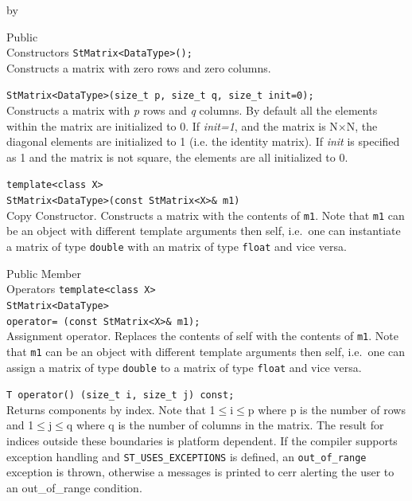 \documentclass[twoside]{article}
\newcommand{\comp}[1]{\texttt{#1}}%
\newcommand{\entrylabel}[1]{\mbox{\textbf{{#1}}}\hfil}%
\newenvironment{entry}
{\begin{list}{}%
    {\renewcommand{\makelabel}{\entrylabel}%
     \setlength{\labelwidth}{90pt}%
     \setlength{\leftmargin}{\labelwidth}
     \advance\leftmargin by \labelsep%
      }%
    }%
  {\end{list}}
\newcommand{\Entrylabel}[1]%
{\raisebox{0pt}[1ex][0pt]{\makebox[\labelwidth][l]%
    {\parbox[t]{\labelwidth}{\hspace{0pt}\textbf{{#1}}}}}}
\newenvironment{Entry}%
{\renewcommand{\entrylabel}{\Entrylabel}\begin{entry}}%
  {\end{entry}}
\begin{document}
\begin{description}
\begin{Entry}
\item[Public\\ Constructors]
    \verb+StMatrix<DataType>();+ \\
    Constructs a matrix with zero rows and zero columns.
    
    \verb+StMatrix<DataType>(size_t p, size_t q, size_t init=0);+ \\
    Constructs a matrix with {\em p} rows and {\em q} columns.  By
    default all the elements within the matrix are initialized
    to 0.  If {\em init=1}, and the matrix is N$\times$N, the diagonal
    elements are initialized to 1 (i.e. the identity matrix).  If
    {\em init} is specified as 1 and the matrix is not square, the
    elements are all initialized to 0.

    \verb+template<class X>+\\
    \verb+StMatrix<DataType>(const StMatrix<X>& m1)+\\
    Copy Constructor. Constructs a matrix with the contents of \comp{m1}.
    Note that \comp{m1} can be an object with different
    template arguments then self, i.e.~one can instantiate
    a matrix of type \comp{double} with an matrix of type
    \comp{float} and vice versa.   
    
\item[Public Member\\ Operators]
    \verb+template<class X>+\\
    \verb+StMatrix<DataType>+\\
    \verb+operator= (const StMatrix<X>& m1);+ \\
    Assignment operator. Replaces the contents of self with the
    contents of \comp{m1}.
    Note that \comp{m1} can be an object with different
    template arguments then self, i.e.~one can assign
    a matrix of type \comp{double} to a matrix of type
    \comp{float} and vice versa.  
    
    \verb+T operator() (size_t i, size_t j) const;+\\
    Returns components by index. Note that 1$\leq$i$\leq$p where p
    is the number of rows and 1$\leq$j$\leq$q where q is
    the number of columns in the matrix.  The result for
    indices outside these boundaries is platform
    dependent. If the compiler supports exception handling and
    \comp{ST\_USES\_EXCEPTIONS} is defined, an 
    \comp{out\_of\_range} exception is thrown, otherwise a
    messages is printed to cerr alerting the user to an out\_of\_range
    condition.


\end{Entry}
\end{description}
\end{document}
